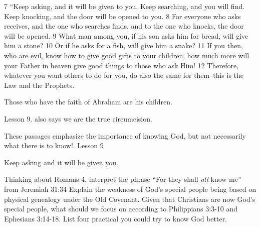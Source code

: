 \begin{bible}
7 ``Keep asking, and it will be given to you. Keep searching, and you will find. Keep knocking, and the door will be opened to you. 8 For everyone who asks receives, and the one who searches finds, and to the one who knocks, the door will be opened. 9 What man among you, if his son asks him for bread, will give him a stone? 10 Or if he asks for a fish, will give him a snake? 11 If you then, who are evil, know how to give good gifts to your children, how much more will your Father in heaven give good things to those who ask Him! 12 Therefore, whatever you want others to do for you, do also the same for them--this is the Law and the Prophets.

\end{bible}

\begin{discussion}


 Those who have the faith of Abraham are his children.

 Lesson 9. also says we are the true circumcision.


These passages emphasize the importance of knowing God, but not necessarily what there is to know!.
 Lesson 9


 Keep asking and it will be given you.

\end{discussion}

\begin{questions}
\q Thinking about Romans 4, interpret the phrase ``For they shall \emph{all} know me'' from Jeremiah 31:34
\q Explain the weakness of God's special people being based on physical genealogy under the Old Covenant.
\q Given that Christians are now God's special people, what should we focus on according to Philippians 3:3-10 and Ephesians 3:14-18.
\q List four practical you could try to know God better.
\end{questions}